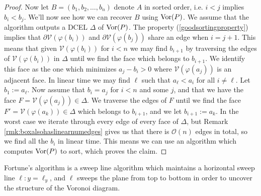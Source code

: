 \begin{proof}
Now let $B = (b_1, b_2, \ldots, b_n)$ denote $A$ in sorted order, i.e. $i < j$ implies $b_i < b_j$. We'll now see how we can recover $B$ using $\operatorname{Vor}(P)$. We assume that the algorithm outputs a DCEL $\Delta$ of $\operatorname{Vor}(P)$. The property (\ref{goodsortingproperty}) implies that $\partial \mathcal{V}(\varphi(b_i))$ and $\partial \mathcal{V}(\varphi(b_j))$ share an edge when $i = j + 1$. This means that given $\mathcal{V}(\varphi(b_i))$ for $i < n$ we may find $b_{i+1}$ by traversing the edges of $\mathcal{V}(\varphi(b_i))$ in $\Delta$ until we find the face which belongs to $b_{i+1}$. We identify this face as the one which minimizes $a_j - b_i > 0$ where $\mathcal{V}(\varphi(a_j))$ is an adjacent face. In linear time we may find $\ell$ such that $a_{\ell} < a_i$ for all $i \ne \ell$. Let $b_1 := a_{\ell}$. Now assume that $b_i = a_j$ for $i < n$ and some $j$, and that we have the face $F = \mathcal{V}(\varphi(a_j)) \in \Delta$. We traverse the edges of $F$ until we find the face $F' = \mathcal{V}(\varphi(a_k)) \in \Delta$ which belongs to $b_{i+1}$, and we let $b_{i+1} := a_k$. In the worst case we iterate through every edge of every face of $\Delta$, but Remark \ref{rmk:boxalsohaslinearnumedges} gives us that there is $\mathcal{O}(n)$ edges in total, so we find all the $b_i$ in linear time. This means we can use an algorithm which computes $\operatorname{Vor}(P)$ to sort, which proves the claim.
\end{proof}

Fortune's algorithm is a sweep line algorithm which maintains a horizontal sweep line $\ell \colon y = \ell_y$, and $\ell$ sweeps the plane from top to bottom in order to uncover the structure of the Voronoi diagram. 

